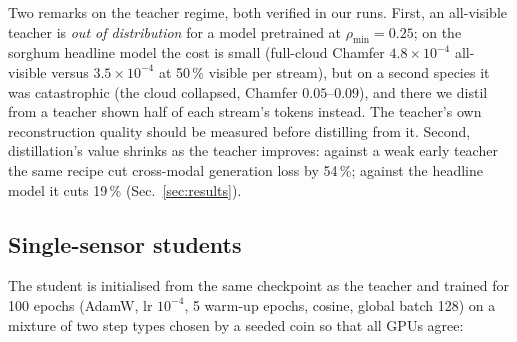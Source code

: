 Two remarks on the teacher regime, both verified in our runs. First, an
all-visible teacher is \emph{out of distribution} for a model pretrained at
$\rho_{\min}{=}0.25$; on the sorghum headline model the cost is small (full-cloud
Chamfer $4.8\times10^{-4}$ all-visible versus $3.5\times10^{-4}$ at 50\,\% visible
per stream), but on a second species it was catastrophic (the cloud collapsed,
Chamfer $0.05$--$0.09$), and there we distil from a teacher shown half of each
stream's tokens instead. The teacher's own reconstruction quality should be
measured before distilling from it. Second, distillation's value shrinks as the
teacher improves: against a weak early teacher the same recipe cut cross-modal
generation loss by 54\,\%; against the headline model it cuts 19\,\%
(Sec.~\ref{sec:results}). 

\subsection{Single-sensor students}
\label{sec:students}

The student is initialised from the same checkpoint as the teacher and trained
for 100 epochs (AdamW, lr $10^{-4}$, 5 warm-up epochs, cosine, global batch 128)
on a mixture of two step types chosen by a seeded coin so that all GPUs agree:

